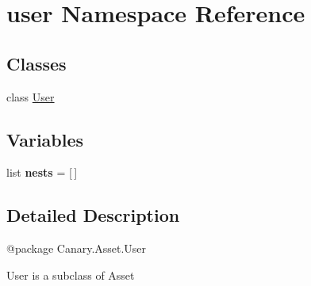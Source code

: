 \hypertarget{namespaceuser}{\section{user Namespace Reference}
\label{namespaceuser}
}
\subsection*{Classes}
\begin{DoxyCompactItemize}
\item 
class \hyperlink{classuser_1_1_user}{User}
\end{DoxyCompactItemize}
\subsection*{Variables}
\begin{DoxyCompactItemize}
\item 
\hypertarget{namespaceuser_a6da2acf5ac2587e104d2f8adaa99177d}{list {\bfseries nests} = \mbox{[}$\,$\mbox{]}}\label{namespaceuser_a6da2acf5ac2587e104d2f8adaa99177d}

\end{DoxyCompactItemize}


\subsection{Detailed Description}
\begin{DoxyVerb}@package Canary.Asset.User

User is a subclass of Asset
\end{DoxyVerb}
 